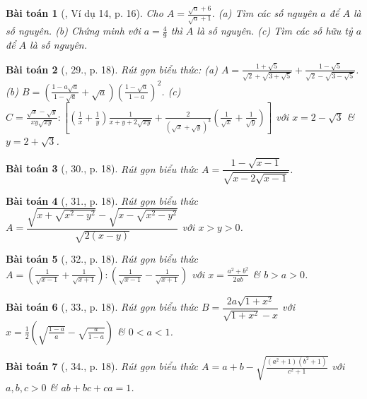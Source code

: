 \documentclass{article}
\newtheorem{baitoan}{Bài toán}
\begin{document}
\begin{baitoan}[\cite{Binh_Toan_9_tap_1}, Ví dụ 14, p. 16]
	Cho $A = \frac{\sqrt{a} + 6}{\sqrt{a} + 1}$. (a) Tìm các số nguyên $a$ để $A$ là số nguyên. (b) Chứng minh với $a = \frac{4}{9}$ thì $A$ là số nguyên. (c) Tìm các số hữu tỷ $a$ để $A$ là số nguyên.
\end{baitoan}

\begin{baitoan}[\cite{Binh_Toan_9_tap_1}, 29., p. 18]
	Rút gọn biểu thức: (a) $A = \frac{1 + \sqrt{5}}{\sqrt{2} + \sqrt{3 + \sqrt{5}}} + \frac{1 - \sqrt{5}}{\sqrt{2} - \sqrt{3 - \sqrt{5}}}$. (b) $B = \left(\frac{1 - a\sqrt{a}}{1 - \sqrt{a}} + \sqrt{a}\right)\left(\frac{1 - \sqrt{a}}{1 - a}\right)^2$. (c) $C = \frac{\sqrt{x} - \sqrt{y}}{xy\sqrt{xy}}:\left[\left(\frac{1}{x} + \frac{1}{y}\right)\frac{1}{x + y+ 2\sqrt{xy}} + \frac{2}{(\sqrt{x} + \sqrt{y})^3}\left(\frac{1}{\sqrt{x}} + \frac{1}{\sqrt{y}}\right)\right]$ với $x = 2 - \sqrt{3}$ \& $y = 2 + \sqrt{3}$.
\end{baitoan}

\begin{baitoan}[\cite{Binh_Toan_9_tap_1}, 30., p. 18]
	Rút gọn biểu thức $A = \dfrac{1 - \sqrt{x - 1}}{\sqrt{x - 2\sqrt{x - 1}}}$.
\end{baitoan}

\begin{baitoan}[\cite{Binh_Toan_9_tap_1}, 31., p. 18]
	Rút gọn biểu thức $A = \dfrac{\sqrt{x + \sqrt{x^2 - y^2}} - \sqrt{x - \sqrt{x^2 - y^2}}}{\sqrt{2(x - y)}}$ với $x > y > 0$.
\end{baitoan}

\begin{baitoan}[\cite{Binh_Toan_9_tap_1}, 32., p. 18]
	Rút gọn biểu thức $A = \left(\frac{1}{\sqrt{x - 1}} + \frac{1}{\sqrt{x + 1}}\right):\left(\frac{1}{\sqrt{x - 1}} - \frac{1}{\sqrt{x + 1}}\right)$ với $x = \frac{a^2 + b^2}{2ab}$ \& $b > a > 0$.
\end{baitoan}

\begin{baitoan}[\cite{Binh_Toan_9_tap_1}, 33., p. 18]
	Rút gọn biểu thức $B = \dfrac{2a\sqrt{1 + x^2}}{\sqrt{1 + x^2} - x}$ với $x = \frac{1}{2}\left(\sqrt{\frac{1 - a}{a}} - \sqrt{\frac{a}{1 - a}}\right)$ \& $0 < a < 1$.
\end{baitoan}

\begin{baitoan}[\cite{Binh_Toan_9_tap_1}, 34., p. 18]
	Rút gọn biểu thức $A = a + b - \sqrt{\frac{(a^2 + 1)(b^2 + 1)}{c^2 + 1}}$ với $a,b,c > 0$ \& $ab + bc + ca = 1$.
\end{baitoan}
\end{document}

